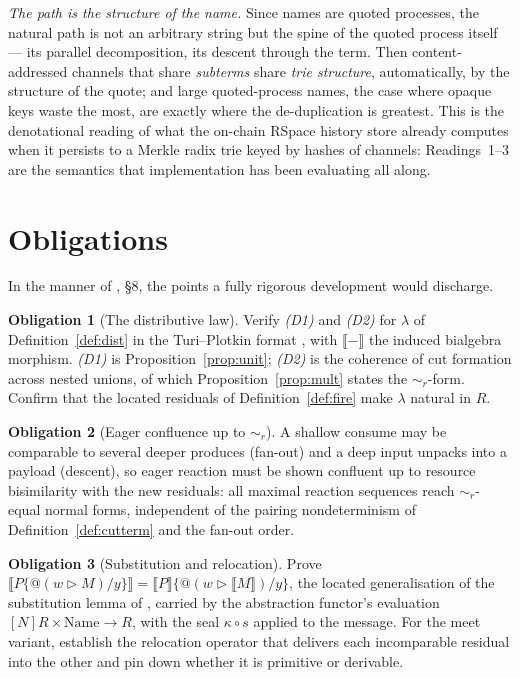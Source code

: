 \documentclass[11pt]{article}
\makeatletter
\theoremstyle{plain}
\theoremstyle{definition}
\newtheorem{obligation}{Obligation}
\newcommand{\den}[1]{\llbracket #1 \rrbracket}
\newcommand{\Name}{\mathrm{Name}}
\newcommand{\loc}{\mathrel{\rhd}}               %
\newcommand{\quo}{@}
\newcommand{\bisr}{\sim_{r}}
\makeatother
\begin{document}
\emph{The path is the structure of the name.} Since names are quoted processes, the natural path is
not an arbitrary string but the spine of the quoted process itself --- its parallel decomposition,
its descent through the term. Then content-addressed channels that share \emph{subterms} share
\emph{trie structure}, automatically, by the structure of the quote; and large quoted-process names,
the case where opaque keys waste the most, are exactly where the de-duplication is greatest. This is
the denotational reading of what the on-chain RSpace history store already computes when it persists
to a Merkle radix trie keyed by hashes of channels: Readings~1--3 are the semantics that
implementation has been evaluating all along.

\section{Obligations}

In the manner of \cite{KnotRho}, \S 8, the points a fully rigorous development would discharge.

\begin{obligation}[The distributive law]
Verify \emph{(D1)} and \emph{(D2)} for $\lambda$ of Definition~\ref{def:dist} in the Turi--Plotkin
format \cite{TP97}, with $\den{-}$ the induced bialgebra morphism. \emph{(D1)} is
Proposition~\ref{prop:unit}; \emph{(D2)} is the coherence of cut formation across nested unions, of
which Proposition~\ref{prop:mult} states the $\bisr$-form. Confirm that the located residuals of
Definition~\ref{def:fire} make $\lambda$ natural in $R$.
\end{obligation}

\begin{obligation}[Eager confluence up to $\bisr$]
A shallow consume may be comparable to several deeper produces (fan-out) and a deep input unpacks into
a payload (descent), so eager reaction must be shown confluent up to resource bisimilarity with the
new residuals: all maximal reaction sequences reach $\bisr$-equal normal forms, independent of the
pairing nondeterminism of Definition~\ref{def:cutterm} and the fan-out order.
\end{obligation}

\begin{obligation}[Substitution and relocation]
Prove $\den{P\{\quo(w\loc M)/y\}}=\den{P}\{\quo(w\loc\den M)/y\}$, the located generalisation of the
substitution lemma of \cite{KnotRho}, carried by the abstraction functor's evaluation
$[N]R\times\Name\to R$, with the seal $\kappa\circ s$ applied to the message. For the meet variant,
establish the relocation operator that delivers each incomparable residual into the other and pin down
whether it is primitive or derivable.
\end{obligation}
\end{document}

